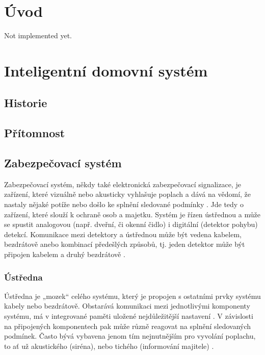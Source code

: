 \documentclass[FM,DP]{tulthesis}  %
\begin{document}

\chapter{Úvod}
Not implemented yet.


\chapter{Inteligentní domovní systém}

\section{Historie}

\section{Přítomnost}


\section{Zabezpečovací systém}
Zabezpečovací systém, někdy také elektronická zabezpečovací signalizace, je zařízení, které vizuálně nebo akusticky vyhlašuje poplach a dává na vědomí, že nastaly nějaké potíže nebo došlo ke splnění sledované podmínky \cite{Security alarm}. Jde tedy o zařízení, které slouží k ochraně osob a majetku. Systém je řízen ústřednou a může se spustit analogovou (např. dveřní, či okenní čidlo) i digitální (detektor pohybu) detekcí. Komunikace mezi detektory a ústřednou může být vedena kabelem, bezdrátově anebo kombinací předešlých způsobů, tj. jeden detektor může být připojen kabelem a druhý bezdrátově \cite{Electronic security system}.

\subsection{Ústředna}
Ústředna je „mozek“ celého systému, který je propojen s ostatními prvky systému kabely nebo bezdrátově. Obstarává komunikaci mezi jednotlivými komponenty systému, má v integrované paměti uložené nejdůležitější nastavení \cite{Electronic security system}. V závislosti na připojených komponentech pak může různě reagovat na splnění sledovaných podmínek. Často bývá vybavena jenom tím nejnutnějším pro vyvolání poplachu, to ať už akustického (siréna), nebo tichého (informování majitele) \cite{Security alarm}.
\end{document}
